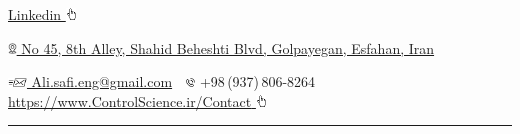 \documentclass[a4paper,MMMyyyy,nonstopmode]{ResumeTemplate}
\newcommand{\CVAuthor}{Ali Safi}
\newcommand{\CVWebpage}{https://www.ControlScience.ir/Contact}
\begin{document}
\centering
\par
\textcolor{Forestg}{}
\par \href{https://www.linkedin.com/in/safi-ali}{Linkedin \includegraphics[height=9pt]{icons/hand-cursor.png}} 

\Title{\CVAuthor} 
\begin{SubTitle}
\href{https://www.google.com/maps/place/8H5GF7CC\%2BPM/@33.4718125,50.2716875,17z/data=!3m1!4b1!4m5!3m4!1s0x0:0x0!8m2!3d33.4718125!4d50.2716875}
{\includegraphics[height=8pt]{icons/locations.png} No 45, 8th Alley, Shahid Beheshti Blvd, Golpayegan, Esfahan, Iran}
\par
\href{mailto:ali.safi.eng@gmail.com}
{\includegraphics[height=7pt]{icons/SendEmail.png} Ali.safi.eng@gmail.com}
\,\SubBulletSymbol\,
\includegraphics[height=7pt]{icons/phone1.png}  +98\,(937)\,806-8264
\,\SubBulletSymbol\,
\href{\CVWebpage}
{\url{\CVWebpage}  \includegraphics[height=9pt]{icons/hand-cursor.png}}
\end{SubTitle}

\textcolor{Forestg}{\hrule height 0.1cm}
\end{document}
